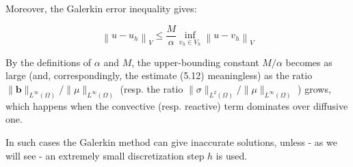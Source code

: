 \documentclass[11pt]{book}
\begin{document}
Moreover, the Galerkin error inequality gives:


\begin{equation}
\left\|u-u_{h}\right\|_{V} \leq \frac{M}{\alpha} \inf _{v_{h} \in V_{h}}\left\|u-v_{h}\right\|_{V}
\end{equation}


By the definitions of $\alpha$ and $M$, the upper-bounding constant $M / \alpha$ becomes as large (and, correspondingly, the estimate (5.12) meaningless) as the ratio $\|\mathbf{b}\|_{L^{\infty}(\Omega)} /\|\mu\|_{L^{\infty}(\Omega)}$ (resp. the ratio $\|\sigma\|_{L^{2}(\Omega)} /\|\mu\|_{L^{\infty}(\Omega)}$ ) grows, which happens when the convective (resp. reactive) term dominates over diffusive one.

In such cases the Galerkin method can give inaccurate solutions, unless - as we will see - an extremely small discretization step $h$ is used.
\end{document}
